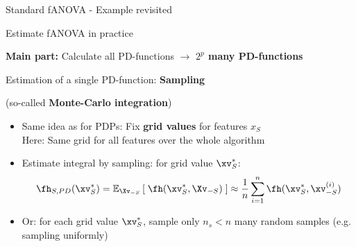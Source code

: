 \documentclass[11pt,compress,t,notes=noshow, aspectratio=169, xcolor=table]{beamer}
\begin{document}
\begin{frame}{Standard fANOVA - Example revisited}
\begin{example}
\begin{itemize}
{        }
        
    \end{itemize}
\end{example}
    
\end{frame}

\begin{frame}{Estimate fANOVA in practice
}

\textbf{Main part:} Calculate all PD-functions $\rightarrow$ \textbf{$2^p$ many PD-functions}

Estimation of a single PD-function: \textbf{Sampling}

(so-called \textbf{Monte-Carlo integration})
\begin{itemize}
    \item Same idea as for PDPs: Fix \textbf{grid values} for features $x_S$ \\
    Here: Same grid for all features over the whole algorithm
    \item Estimate integral by sampling: for grid value $\xv_S^*$:
    $$
    \fh_{S, PD}(\xv_S^*) 
    = \mathbb{E}_{\Xv_{-S}} \left[ \; \fh(\xv_S^*, \Xv_{-S}) \; \right]
    \approx \frac{1}{n} \sum_{i=1}^n \fh(\xv_S^*, \xv_{-S}^{(i)})
    $$
    \item Or: for each grid value $\xv_S^*$, sample only $n_s < n$ many random samples (e.g. sampling uniformly)
\end{itemize}


    
\end{frame}
\end{document}
